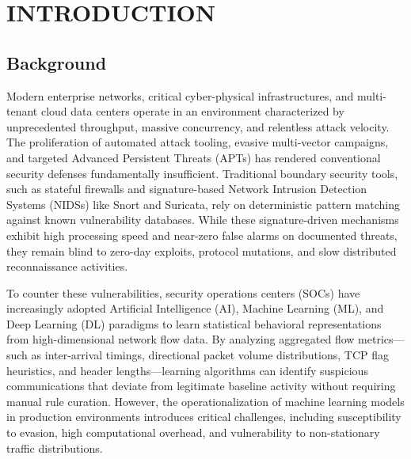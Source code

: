 \documentclass[12pt,a4paper]{report}
\begin{document}
\clearpage
{}
\setcounter{page}{1}

\chapter{INTRODUCTION}\label{ch:intro}

\section{Background}
Modern enterprise networks, critical cyber-physical infrastructures, and multi-tenant cloud data centers operate in an environment characterized by unprecedented throughput, massive concurrency, and relentless attack velocity. The proliferation of automated attack tooling, evasive multi-vector campaigns, and targeted Advanced Persistent Threats (APTs) has rendered conventional security defenses fundamentally insufficient. Traditional boundary security tools, such as stateful firewalls and signature-based Network Intrusion Detection Systems (NIDSs) like Snort and Suricata, rely on deterministic pattern matching against known vulnerability databases. While these signature-driven mechanisms exhibit high processing speed and near-zero false alarms on documented threats, they remain blind to zero-day exploits, protocol mutations, and slow distributed reconnaissance activities.

To counter these vulnerabilities, security operations centers (SOCs) have increasingly adopted Artificial Intelligence (AI), Machine Learning (ML), and Deep Learning (DL) paradigms to learn statistical behavioral representations from high-dimensional network flow data. By analyzing aggregated flow metrics---such as inter-arrival timings, directional packet volume distributions, TCP flag heuristics, and header lengths---learning algorithms can identify suspicious communications that deviate from legitimate baseline activity without requiring manual rule curation. However, the operationalization of machine learning models in production environments introduces critical challenges, including susceptibility to evasion, high computational overhead, and vulnerability to non-stationary traffic distributions.
\end{document}
